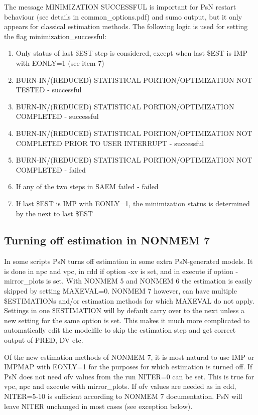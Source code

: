 	The message MINIMIZATION SUCCESSFUL is important for PsN restart behaviour (see details in common\_options.pdf) and sumo output, but it only appears for classical estimation methods. The following logic is used for setting the flag minimization\_successful:
	
	\begin{enumerate}
		\item Only status of last \$EST step is considered, except when last \$EST is IMP with EONLY=1 (see item 7)
		\item BURN-IN/(REDUCED) STATISTICAL PORTION/OPTIMIZATION NOT TESTED - successful
		\item BURN-IN/(REDUCED) STATISTICAL PORTION/OPTIMIZATION COMPLETED - successful
		\item BURN-IN/(REDUCED) STATISTICAL PORTION/OPTIMIZATION NOT COMPLETED PRIOR TO USER INTERRUPT - successful
		\item BURN-IN/(REDUCED) STATISTICAL PORTION/OPTIMIZATION NOT COMPLETED - failed
		\item If any of the two steps in SAEM failed - failed 
		\item If last \$EST is IMP with EONLY=1, the minimization status is determined by the next to last \$EST
	\end{enumerate}
	
	\subsection{Turning off estimation in NONMEM 7}
	
	In some scripts PsN turns off estimation in some extra PsN-generated models. It is done in npc and vpc, in cdd if option -xv is set, and in execute if option -mirror\_plots is set. With NONMEM 5 and NONMEM 6 the estimation is easily skipped by setting MAXEVAL=0. NONMEM 7 however,  can have multiple \$ESTIMATIONs and/or estimation methods for which MAXEVAL do not apply. Settings in one \$ESTIMATION will by default carry over to the next unless a new setting for the same option is set. This makes it much more complicated to automatically edit the modelfile to skip the estimation step and get correct output of PRED, DV etc. 
	
	Of the new estimation methods of NONMEM 7, it is most natural to use IMP or IMPMAP with EONLY=1 for the purposes for which estimation is turned off. If PsN does not need ofv values from the run NITER=0 can be set. This is true for vpc, npc and execute with mirror\_plots. If ofv values are needed as in cdd, NITER=5-10 is sufficient according to NONMEM 7 documentation. PsN will leave NITER unchanged in most cases (see exception below).
	
